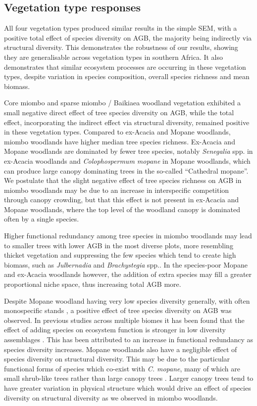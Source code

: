 \begin{refsection}
\subsection{Vegetation type responses}
\label{befr:ssec:veg_type_response}

All four vegetation types produced similar results in the simple SEM, with a positive total effect of species diversity on AGB, the majority being indirectly via structural diversity. This demonstrates the robustness of our results, showing they are generalisable across vegetation types in southern Africa. It also demonstrates that similar ecosystem processes are occurring in these vegetation types, despite variation in species composition, overall species richness and mean biomass.

Core miombo and sparse miombo / Baikiaea woodland vegetation exhibited a small negative direct effect of tree species diversity on AGB, while the total effect, incorporating the indirect effect via structural diversity, remained positive in these vegetation types. Compared to ex-Acacia and Mopane woodlands, miombo woodlands have higher median tree species richness. Ex-Acacia and Mopane woodlands are dominated by fewer tree species, notably \textit{Senegalia} spp. in ex-Acacia woodlands and \textit{Colophospermum mopane} in Mopane woodlands, which can produce large canopy dominating trees in the so-called ``Cathedral mopane''. We postulate that the slight negative effect of tree species richness on AGB in miombo woodlands may be due to an increase in interspecific competition through canopy crowding, but that this effect is not present in ex-Acacia and Mopane woodlands, where the top level of the woodland canopy is dominated often by a single species. 

Higher functional redundancy among tree species in miombo woodlands may lead to smaller trees with lower AGB in the most diverse plots, more resembling thicket vegetation and suppressing the few species which tend to create high biomass, such as \textit{Julbernadia} and \textit{Brachystegia} spp.. In the species-poor Mopane and ex-Acacia woodlands however, the addition of extra species may fill a greater proportional niche space, thus increasing total AGB more. 

Despite Mopane woodland having very low species diversity generally, with often monospecific stands \citep{Timberlake2010}, a positive effect of tree species diversity on AGB was observed. In previous studies across multiple biomes it has been found that the effect of adding species on ecosystem function is stronger in low diversity assemblages \citep{Cardinale2006, Srivastava2005}. This has been attributed to an increase in functional redundancy as species diversity increases. Mopane woodlands also have a negligible effect of species diversity on structural diversity. This may be due to the particular functional forms of species which co-exist with \textit{C. mopane}, many of which are small shrub-like trees rather than large canopy trees \citep{Timberlake2010}. Larger canopy trees tend to have greater variation in physical structure \citep{Seidel2019} which would drive an effect of species diversity on structural diversity as we observed in miombo woodlands.


\end{refsection}
